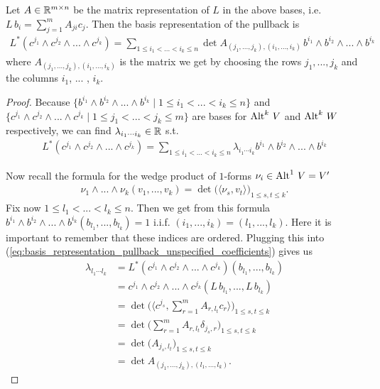 \documentclass[../master_thesis.tex]{subfiles}
\begin{document}
\begin{proposition}
    Let $A \in \mathbb{R}^{m\times n}$ be the matrix representation of $L$ in the 
    above bases, i.e.
    $L\,b_i = \sum_{j=1}^m A_{ji} c_j$. Then the basis representation 
    of the pullback is
    \begin{align}
        L^* (c^{j_1} \wedge c^{j_2} \wedge ... \wedge c^{j_k})
        = \sum\limits_{1 \leq i_1 < ... < i_k \leq n} 
            \det A_{(j_1,...,j_k),(i_1,...,i_k)} \,
            b^{i_1} \wedge b^{i_2} \wedge ... \wedge b^{i_k}
        \label{eq:basis_representation_pullback}
    \end{align}
    where $A_{(j_1,...,j_k),(i_1,...,i_k)}$ is the matrix we get 
    by choosing the rows $j_1,...,j_k$  and the columns $i_1$, ... , $i_k$. 
\end{proposition}
\begin{proof}
    Because $\{ b^{i_1}\wedge b^{i_2}\wedge ... \wedge b^{i_k} 
    \mid 1 \leq i_1 < ... < i_k  \leq n \}$ and 
    $\{ c^{j_1}\wedge c^{j_2}\wedge ... \wedge c^{j_k} 
    \mid 1 \leq j_1 < ... < j_k  \leq m \}$ are bases for ${\operatorname{Alt}^{k}\,V}$ 
    and ${\operatorname{Alt}^{k}\,W}$ respectively, we can find $\lambda_{i_1 \cdots i_k} \in \mathbb{R}$ s.t.
    \begin{align}
        L^* (c^{j_1} \wedge c^{j_2} \wedge ... \wedge c^{j_k})
        = \sum\limits_{1 \leq i_1 < ... < i_k \leq n} 
        \lambda_{i_1 \cdots i_k} b^{i_1} \wedge b^{i_2} \wedge ... \wedge b^{i_k}
        \label{eq:basis_representation_pullback_unspecified_coefficients}
    \end{align}

    Now recall the formula for the wedge product of $1$-forms 
    $\nu_i \in {\operatorname{Alt}^{1}\,V} = V'$
    \begin{align*}
        \nu_1 \wedge ... \wedge \nu_k (v_1,...,v_k) = 
        \det \big( \langle \nu_s, v_t \rangle \big)_{1 \leq s,t \leq k}.
    \end{align*}
    Fix now $1 \leq l_1 < ... <  l_k \leq n$. Then we get from this formula
    $b^{i_1} \wedge b^{i_2} \wedge ... \wedge b^{i_k} ( b_{l_1},...,b_{l_k}) = 1$ 
    i.i.f. $(i_1,...,i_k) = (l_1,...,l_k)$. Here it is important to remember that 
    these indices are ordered. Plugging this into 
    (\ref{eq:basis_representation_pullback_unspecified_coefficients}) gives us 
    \begin{align*}
        \lambda_{l_1 \cdots l_k}  &= 
            L^* (c^{j_1} \wedge c^{j_2} \wedge ... \wedge c^{j_k})
            (b_{l_1},...,b_{l_k})
        \\ &= c^{j_1} \wedge c^{j_2} \wedge ... \wedge c^{j_k} 
            (L\,b_{l_1},...,L\,b_{l_k})
        \\ &= \det \Big( \big \langle c^{j_s}, \sum_{r = 1}^m A_{r,l_t}c_{r} \big \rangle 
            \Big)_{1 \leq s,t \leq k}
        \\ &= \det \Big( \sum_{r = 1}^m A_{r,l_t} \delta_{j_s,r}
            \Big)_{1 \leq s,t \leq k}
        \\ &= \det \big( A_{j_s,l_t} \big)_{1 \leq s,t \leq k}
        \\ &= \det A_{(j_1,...,j_k),(l_1,...,l_k)}.
    \end{align*}
\end{proof}
\end{document}
